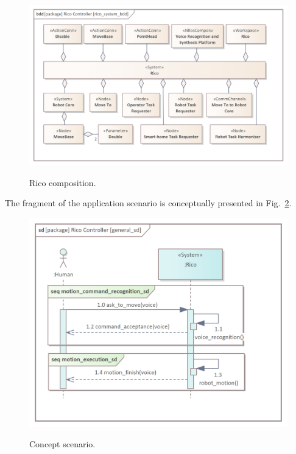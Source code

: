 \documentclass[11pt,oneside,a4paper]{report}
\begin{document}
	
	\begin{figure}[H] 
		\centering
		\begin{center}
			{\includegraphics[scale=.9]{img/rico_pkg/rico_system_bdd.png}}
		\end{center}
		\caption{Rico \stSystem{} composition.} 
		\label{fig:rico_system_bdd}
	\end{figure}
	
	
	The fragment of the application scenario is conceptually presented in Fig.~\ref{fig:general_sd}.
	

	\begin{figure}[H] 
		\centering
		\begin{center}
			{\includegraphics[scale=.9]{img/rico_pkg/general_sd.png}}
		\end{center}
		\caption{Concept scenario.} 
		\label{fig:general_sd}
	\end{figure}
	
\end{document}
